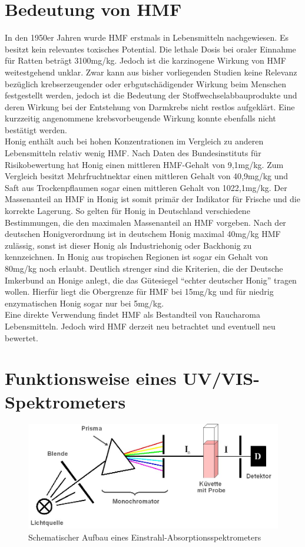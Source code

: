 \section{Bedeutung von HMF}
In den 1950er Jahren wurde HMF erstmals in Lebensmitteln nachgewiesen. Es besitzt kein relevantes toxisches Potential. Die lethale Dosis bei oraler Einnahme für Ratten beträgt 3100mg/kg. Jedoch ist die karzinogene Wirkung von HMF weitestgehend unklar. Zwar kann aus bisher vorliegenden Studien keine Relevanz bezüglich krebserzeugender oder erbgutschädigender Wirkung beim Menschen festgestellt werden, jedoch ist die Bedeutung der Stoffwechselabbauprodukte und deren Wirkung bei der Entstehung von Darmkrebs nicht restlos aufgeklärt. Eine kurzzeitig angenommene krebsvorbeugende Wirkung konnte ebenfalls nicht bestätigt werden.
\\
Honig enthält auch bei hohen Konzentrationen im Vergleich zu anderen Lebensmitteln relativ wenig HMF. Nach Daten des Bundesinstituts für Risikobewertung hat Honig einen mittleren HMF-Gehalt von 9,1mg/kg. Zum Vergleich besitzt Mehrfruchtnektar einen mittleren Gehalt von 40,9mg/kg und Saft aus Trockenpflaumen sogar einen mittleren Gehalt von 1022,1mg/kg. Der Massenanteil an HMF in Honig ist somit primär der Indikator für Frische und die korrekte Lagerung. So gelten für Honig in Deutschland verschiedene Bestimmungen, die den maximalen Massenanteil an HMF vorgeben. Nach der deutschen Honigverordnung ist in deutschem Honig maximal 40mg/kg HMF zulässig, sonst ist dieser Honig als Industriehonig oder Backhonig zu kennzeichnen. In Honig aus tropischen Regionen ist sogar ein Gehalt von 80mg/kg noch erlaubt. Deutlich strenger sind die Kriterien, die der Deutsche Imkerbund an Honige anlegt, die das Gütesiegel ``echter deutscher Honig'' tragen wollen. Hierfür liegt die Obergrenze für HMF bei 15mg/kg und für niedrig enzymatischen Honig sogar nur bei 5mg/kg.
\\
Eine direkte Verwendung findet HMF als Bestandteil von Raucharoma Lebensmitteln. Jedoch wird HMF derzeit neu betrachtet und eventuell neu bewertet.~\cite{BfR}

\section{Funktionsweise eines UV/VIS-Spektrometers}

\begin{figure}[htbp]
    \centering
        \includegraphics[width=1.00\textwidth]{../Bilder/Einstrahlspektrometer.jpg}
    \caption{Schematischer Aufbau eines Einstrahl-Absorptionsspektrometers \cite{Schema}}
    \label{fig:Einstrahlspektrometer}
\end{figure}

